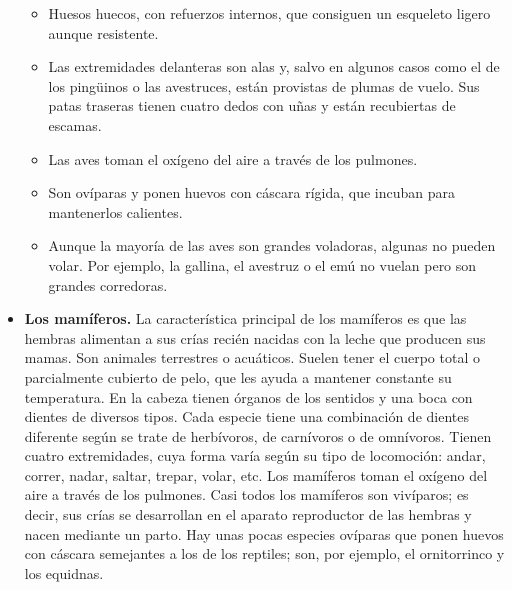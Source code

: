 \begin{itemize}
\begin{itemize}
        \item Huesos huecos, con refuerzos internos, que consiguen un esqueleto ligero aunque resistente.
        \item Las extremidades delanteras son alas y, salvo en algunos casos como el de los pingüinos o las avestruces, están provistas de plumas de vuelo. Sus patas traseras tienen cuatro dedos con uñas y están recubiertas de escamas.
        \item Las aves toman el oxígeno del aire a través de los pulmones.
        \item Son ovíparas y ponen huevos con cáscara rígida, que incuban para mantenerlos calientes.
        \item Aunque la mayoría de las aves son grandes voladoras, algunas no pueden volar. Por ejemplo, la gallina, el avestruz o el emú no vuelan pero son grandes corredoras.
    \end{itemize}
    \item \textbf{Los mamíferos.} La característica principal de los mamíferos es que las hembras alimentan a sus crías recién nacidas con la leche que producen sus mamas. Son animales terrestres o acuáticos. Suelen tener el cuerpo total o parcialmente cubierto de pelo, que les ayuda a mantener constante su temperatura. En la cabeza tienen órganos de los sentidos y una boca con dientes de diversos tipos. Cada especie tiene una combinación de dientes diferente según se trate de herbívoros, de carnívoros o de omnívoros. Tienen cuatro extremidades, cuya forma varía según su tipo de locomoción: andar, correr, nadar, saltar, trepar, volar, etc. Los mamíferos toman el oxígeno del aire a través de los pulmones. Casi todos los mamíferos son vivíparos; es decir, sus crías se desarrollan en el aparato reproductor de las hembras y nacen mediante un parto. Hay unas pocas especies ovíparas que ponen huevos con cáscara semejantes a los de los reptiles; son, por ejemplo, el ornitorrinco y los equidnas.
\end{itemize}